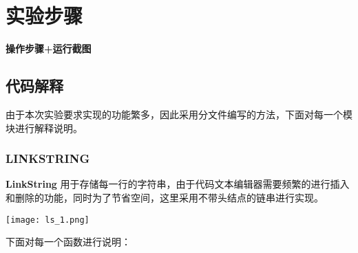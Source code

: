 \section{实验步骤}
    \textbf{操作步骤+运行截图}
    \subsection{代码解释}
        \par 由于本次实验要求实现的功能繁多，因此采用分文件编写的方法，下面对每一个模块进行解释说明。
        \subsubsection{LINKSTRING}  
            \par \textbf{LinkString} 用于存储每一行的字符串，由于代码文本编辑器需要频繁的进行插入和删除的功能，同时为了节省空间，这里采用不带头结点的链串进行实现。
            \begin{figure*}[htbp]
                \texttt{[image: ls\_1.png]}
            \end{figure*}
            \newpage
            \par 下面对每一个函数进行说明：
